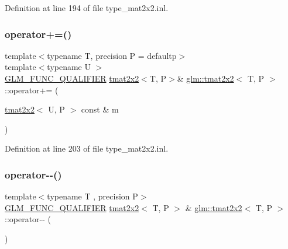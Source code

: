 Definition at line 194 of file type\+\_\+mat2x2.\+inl.

\mbox{\label{structglm_1_1tmat2x2_a2edb661b12cd29f51e3dee238d904408}} 
\subsubsection{\texorpdfstring{operator+=()}{operator+=()}\hspace{0.1cm}{\footnotesize\ttfamily [4/4]}}
{\footnotesize\ttfamily template$<$typename T, precision P = defaultp$>$ \\
template$<$typename U $>$ \\
\mbox{\hyperlink{setup_8hpp_a33fdea6f91c5f834105f7415e2a64407}{G\+L\+M\+\_\+\+F\+U\+N\+C\+\_\+\+Q\+U\+A\+L\+I\+F\+I\+ER}} \mbox{\hyperlink{structglm_1_1tmat2x2}{tmat2x2}}$<$T, P$>$\& \mbox{\hyperlink{structglm_1_1tmat2x2}{glm\+::tmat2x2}}$<$ T, P $>$\+::operator+= (\begin{DoxyParamCaption}\item[{\mbox{\hyperlink{structglm_1_1tmat2x2}{tmat2x2}}$<$ U, P $>$ const \&}]{m }\end{DoxyParamCaption})}



Definition at line 203 of file type\+\_\+mat2x2.\+inl.

\mbox{\label{structglm_1_1tmat2x2_a3f180d690b3ebc06b9fc6ecc4cbd8349}} 
\subsubsection{\texorpdfstring{operator-\/-\/()}{operator--()}\hspace{0.1cm}{\footnotesize\ttfamily [1/2]}}
{\footnotesize\ttfamily template$<$typename T , precision P$>$ \\
\mbox{\hyperlink{setup_8hpp_a33fdea6f91c5f834105f7415e2a64407}{G\+L\+M\+\_\+\+F\+U\+N\+C\+\_\+\+Q\+U\+A\+L\+I\+F\+I\+ER}} \mbox{\hyperlink{structglm_1_1tmat2x2}{tmat2x2}}$<$ T, P $>$ \& \mbox{\hyperlink{structglm_1_1tmat2x2}{glm\+::tmat2x2}}$<$ T, P $>$\+::operator-\/-\/ (\begin{DoxyParamCaption}{ }\end{DoxyParamCaption})}



